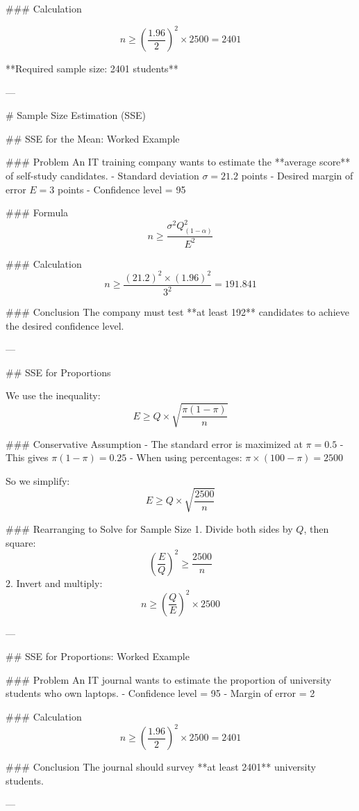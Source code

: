 ### Calculation

\[
n \geq \left( \frac{1.96}{2} \right)^2 \times 2500 = 2401
\]

**Required sample size: 2401 students**

---

# Sample Size Estimation (SSE)

## SSE for the Mean: Worked Example

### Problem
An IT training company wants to estimate the **average score** of self-study candidates.  
- Standard deviation \( \sigma = 21.2 \) points  
- Desired margin of error \( E = 3 \) points  
- Confidence level = 95%

### Formula
\[
n \geq \frac{\sigma^2 Q^2_{(1-\alpha)}}{E^2}
\]

### Calculation
\[
n \geq \frac{(21.2)^2 \times (1.96)^2}{3^2} = 191.841
\]

### Conclusion
The company must test **at least 192** candidates to achieve the desired confidence level.

---

## SSE for Proportions

We use the inequality:
\[
E \geq Q \times \sqrt{ \frac{\pi(1 - \pi)}{n} }
\]

### Conservative Assumption
- The standard error is maximized at \( \pi = 0.5 \)
- This gives \( \pi(1 - \pi) = 0.25 \)
- When using percentages: \( \pi \times (100 - \pi) = 2500 \)

So we simplify:
\[
E \geq Q \times \sqrt{ \frac{2500}{n} }
\]

### Rearranging to Solve for Sample Size
1. Divide both sides by \( Q \), then square:
\[
\left( \frac{E}{Q} \right)^2 \geq \frac{2500}{n}
\]
2. Invert and multiply:
\[
n \geq \left( \frac{Q}{E} \right)^2 \times 2500
\]

---

## SSE for Proportions: Worked Example

### Problem
An IT journal wants to estimate the proportion of university students who own laptops.  
- Confidence level = 95%
- Margin of error = 2%

### Calculation
\[
n \geq \left( \frac{1.96}{2} \right)^2 \times 2500 = 2401
\]

### Conclusion
The journal should survey **at least 2401** university students.

---
